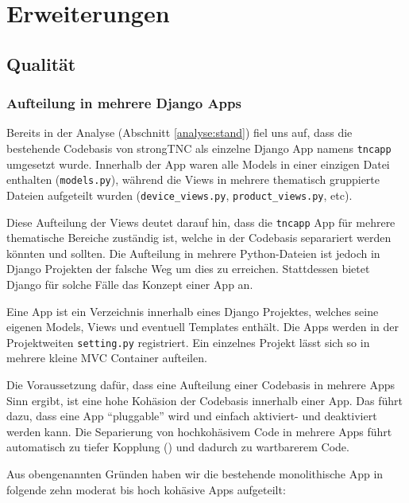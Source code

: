 \section{Erweiterungen}

\subsection{Qualität}

\subsubsection{Aufteilung in mehrere Django Apps}

Bereits in der Analyse (Abschnitt \ref{analyse:stand}) fiel uns auf, dass
die bestehende Codebasis von strongTNC als einzelne Django App namens
\texttt{tncapp} umgesetzt wurde. Innerhalb der App waren alle Models in einer
einzigen Datei enthalten (\texttt{models.py}), während die Views in mehrere
thematisch gruppierte Dateien aufgeteilt wurden (\texttt{device\_views.py},
\texttt{product\_views.py}, etc).

Diese Aufteilung der Views deutet darauf hin, dass die \texttt{tncapp} App für
mehrere thematische Bereiche zuständig ist, welche in der Codebasis separariert
werden könnten und sollten. Die Aufteilung in mehrere Python-Dateien ist jedoch
in Django Projekten der falsche Weg um dies zu erreichen. Stattdessen bietet
Django für solche Fälle das Konzept einer App an.

Eine App ist ein Verzeichnis innerhalb eines Django Projektes, welches seine eigenen
Models, Views und eventuell Templates enthält. Die Apps werden in der
Projektweiten \texttt{setting.py} registriert. Ein einzelnes Projekt lässt sich
so in mehrere kleine MVC Container aufteilen.

Die Voraussetzung dafür, dass eine Aufteilung einer Codebasis in mehrere Apps
Sinn ergibt, ist eine hohe Kohäsion der Codebasis innerhalb einer App. Das führt
dazu, dass eine App \enquote{pluggable} wird und einfach aktiviert- und
deaktiviert werden kann. Die Separierung von hochkohäsivem Code in mehrere Apps
führt automatisch zu tiefer Kopplung (\cite[p.~232--237]{larman2002applying})
und dadurch zu wartbarerem Code.

Aus obengenannten Gründen haben wir die bestehende monolithische App in folgende
zehn moderat bis hoch kohäsive Apps aufgeteilt:

